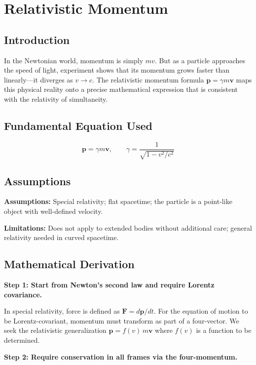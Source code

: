 \chapter{Relativistic Momentum}

\section*{Introduction}

In the Newtonian world, momentum is simply $mv$. But as a particle approaches the speed of light, experiment shows that its momentum grows faster than linearly---it diverges as $v \to c$. The relativistic momentum formula $\mathbf{p} = \gamma m\mathbf{v}$ maps this physical reality onto a precise mathematical expression that is consistent with the relativity of simultaneity.
\section*{Fundamental Equation Used}

\begin{equation}
\mathbf{p} = \gamma m \mathbf{v}, \qquad \gamma = \frac{1}{\sqrt{1 - v^2/c^2}}
\end{equation}
\section*{Assumptions}

\textbf{Assumptions:} Special relativity; flat spacetime; the particle is a point-like object with well-defined velocity.


\textbf{Limitations:} Does not apply to extended bodies without additional care; general relativity needed in curved spacetime.


\section*{Mathematical Derivation}

\textbf{Step 1: Start from Newton's second law and require Lorentz covariance.}

In special relativity, force is defined as $\mathbf{F} = d\mathbf{p}/dt$. For the equation of motion to be Lorentz-covariant, momentum must transform as part of a four-vector. We seek the relativistic generalization $\mathbf{p} = f(v)\,m\mathbf{v}$ where $f(v)$ is a function to be determined.

\textbf{Step 2: Require conservation in all frames via the four-momentum.}

